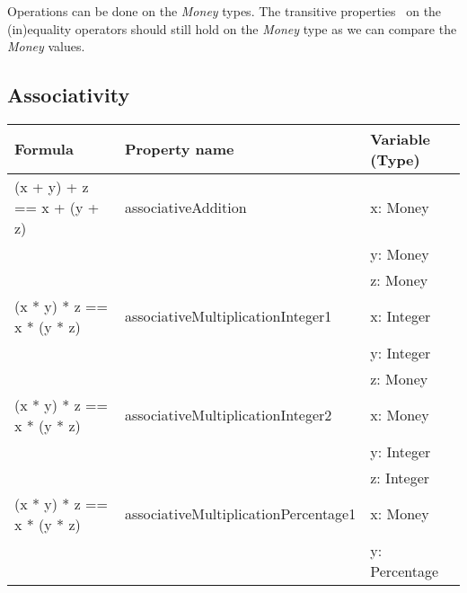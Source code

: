 \FloatBarrier
Operations can be done on the \textit{Money} types. The transitive
properties~\cite{raftery2011perspective} on the (in)equality operators should
still hold on the \textit{Money} type as we can compare the \textit{Money}
values.

\subsection*{Associativity}
\label{ssct:properties_associativity}
\FloatBarrier
\begin{table}[!ht]
\centering
\begin{tabular}{lll}
\hline
                        \textbf{Formula}           & \textbf{Property name}               & \textbf{Variable (Type)} \\ \hline
\rowcolor[HTML]{EFEFEF} (x + y) + z == x + (y + z) & associativeAddition                  & x: Money                 \\
\rowcolor[HTML]{EFEFEF}                            &                                      & y: Money                 \\
\rowcolor[HTML]{EFEFEF}                            &                                      & z: Money                 \\
                        (x * y) * z == x * (y * z) & associativeMultiplicationInteger1    & x: Integer               \\
                                                   &                                      & y: Integer               \\
                                                   &                                      & z: Money                 \\
\rowcolor[HTML]{EFEFEF} (x * y) * z == x * (y * z) & associativeMultiplicationInteger2    & x: Money                 \\
\rowcolor[HTML]{EFEFEF}                            &                                      & y: Integer               \\
\rowcolor[HTML]{EFEFEF}                            &                                      & z: Integer               \\
                        (x * y) * z == x * (y * z) & associativeMultiplicationPercentage1 & x: Money                 \\
                                                   &                                      & y: Percentage            \\

\end{tabular}
\end{table}
